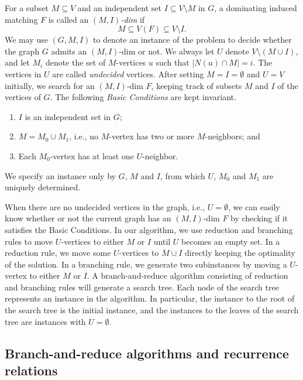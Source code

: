 \documentclass{elsart_TR2}
\begin{document}
\medskip
For a subset $M\subseteq V$ and an independent set
$I\subseteq V\setminus M$ in $G$,
a dominating induced matching $F$ is called an {\em $(M,I)$-dim}
if
\[M\subseteq V(F) \subseteq V\setminus I.\]
We may use $(G,M,I)$ to denote an instance of the problem to decide whether the graph $G$ admits an $(M,I)$-dim or not.
We always let $U$ denote $V\setminus (M\cup I)$,
and let $M_i$ denote the set of $M$-vertices $u$ such that $|N(u)\cap M|=i$.
The vertices in $U$ are called {\em undecided\/} vertices.
After setting $M=I=\emptyset$ and $U=V$ initially,
we search for an $(M,I)$-dim $F$,
 keeping track of subsets $M$ and $I$ of the vertices of $G$.
The following \emph{Basic Conditions} are kept invariant.
\begin{enumerate}
\item
$I$ is an independent set in $G$;
\item
$M=M_0\cup M_1$, i.e., no $M$-vertex has two or more $M$-neighbors; and
\item
Each $M_0$-vertex has  at least one $U$-neighbor.
\end{enumerate}
We specify an instance only by $G$, $M$ and $I$, from which
$U$, $M_0$ and $M_1$ are uniquely determined.



When there are no undecided vertices in the graph, i.e., $U=\emptyset$,
we can easily know whether or not the  current graph has an $(M,I)$-dim $F$ by checking if it satisfies the Basic Conditions.
In our algorithm, we use reduction and branching rules to move
$U$-vertices to either $M$ or $I$ until $U$ becomes an empty set. In a reduction rule, we move some $U$-vertices  to $M\cup I$ directly keeping the optimality of the solution.
In a branching rule, we generate two subinstances by moving a $U$-vertex to either $M$ or $I$. A branch-and-reduce algorithm consisting of reduction and branching rules will generate a search tree.
Each node of the search tree represents an instance in the algorithm.
In particular, the instance to the root of the search tree is the initial instance, and
 the instances to the leaves of the search tree are instances with $U=\emptyset$.

\subsection{Branch-and-reduce algorithms and recurrence relations}
\end{document}
